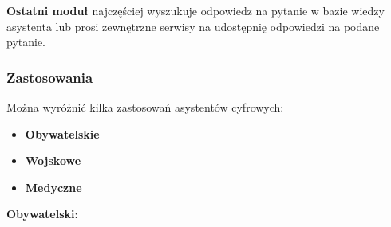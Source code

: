 \textbf{Ostatni moduł} najczęściej wyszukuje odpowiedz na pytanie w bazie wiedzy asystenta lub prosi zewnętrzne serwisy na udostępnię odpowiedzi na podane pytanie. \\

\subsubsection{Zastosowania}

Można wyróżnić kilka zastosowań asystentów cyfrowych: 

\begin{itemize}
	\item \textbf{Obywatelskie} 
	\item \textbf{Wojskowe} 
	\item \textbf{Medyczne} \\
\end{itemize}

\textbf{Obywatelski}: 

